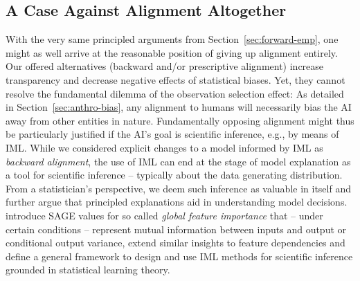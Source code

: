 \documentclass{article}
\theoremstyle{plain}
\theoremstyle{definition}
\theoremstyle{remark}
\begin{document}
\subsection{A Case Against Alignment Altogether} With the very same principled arguments from Section~\ref{sec:forward-emp}, one might as well arrive at the reasonable position of giving up alignment entirely. 
Our offered alternatives (backward and/or prescriptive alignment) increase transparency and decrease negative effects of statistical biases.
Yet, they cannot resolve the fundamental dilemma of the observation selection effect: As detailed in Section~\ref{sec:anthro-bias}, any alignment to humans will necessarily bias the AI away from other entities in nature. Fundamentally opposing alignment might thus be particularly justified if the AI's goal is scientific inference, e.g., by means of IML.
While we considered explicit changes to a model informed by IML as \textit{backward alignment}, the use of IML can end at the stage of model explanation as a tool for scientific inference \cite{Freiesleben_2024, ewald2024_fi, molnar_iml_dgp_2023, könig2024dip} -- typically about the data generating distribution. From a statistician's perspective, we deem such inference as valuable in itself and further argue that principled explanations aid in understanding model decisions. \citet{covert20_sage} introduce SAGE values for so called \textit{global feature importance} that -- under certain conditions -- represent mutual information between inputs and output or conditional output variance, \citet{könig2024dip} extend similar insights to feature dependencies and \citet{Freiesleben_2024} define a general framework to design and use IML methods for scientific inference grounded in statistical learning theory.
\end{document}
